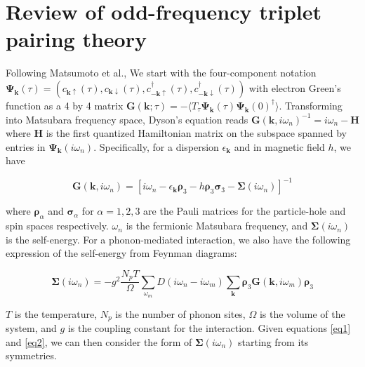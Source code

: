 \documentclass[a4paper,12pt]{article}
\begin{document}
\section{Review of odd-frequency triplet pairing theory}

\noindent Following Matsumoto et al.\cite{Matsumoto}, We start with the four-component notation $\mathbf{\Psi}_{\mathbf{k}}(\tau)=(c_{\mathbf{k}\uparrow}(\tau), c_{\mathbf{k}\downarrow}(\tau), c_{-\mathbf{k}\uparrow}^{\dag}(\tau), c_{-\mathbf{k}\downarrow}^{\dag}(\tau))$ with electron Green's function as a 4 by 4 matrix $\textbf{G}(\mathbf{k};\tau)=-\langle T_{\tau}\mathbf{\Psi_{k}}(\tau)\mathbf{\Psi_{k}}(0)^{\dag}\rangle$. Transforming into Matsubara frequency space, Dyson's equation reads $\textbf{G}(\textbf{k},i\omega_{n})^{-1}=i\omega_{n}-\textbf{H}$ where $\textbf{H}$ is the first quantized Hamiltonian matrix on the subspace spanned by entries in $\boldsymbol\Psi_\textbf{k}(i\omega_{n})$. Specifically, for a dispersion  $\epsilon_{\textbf{k}}$ and in magnetic field $h$, we have

\begin{equation} \label{eq1}
    \textbf{G}(\textbf{k},i\omega_{n})=[i\omega_{n}-\epsilon_{\mathbf{k}}\boldsymbol\rho_{3}-h\boldsymbol\rho_{3}\boldsymbol\sigma_{3}-\boldsymbol\Sigma(i\omega_{n})]^{-1}
\end{equation}

\noindent where $\boldsymbol\rho_{\alpha}$ and $\boldsymbol\sigma_{\alpha}$ for $\alpha=1,2,3$ are the Pauli matrices for the particle-hole and spin spaces respectively. $\omega_{n}$ is the fermionic Matsubara frequency, and $\boldsymbol\Sigma(i\omega_{n})$ is the self-energy. For a phonon-mediated interaction, we also have the following expression of the self-energy from Feynman diagrams:

\begin{equation} \label{eq2}
    \boldsymbol\Sigma(i\omega_{n})=-g^{2}\frac{N_{p}T}{\Omega}\sum_{\omega_{m}}D(i\omega_{n}-i\omega_{m})\sum_{\textbf{k}}\boldsymbol\rho_{3}\textbf{G}(\textbf{k},i\omega_{m})\boldsymbol\rho_{3}
\end{equation}

\noindent $T$ is the temperature, $N_{p}$ is the number of phonon sites, $\Omega$ is the volume of the system, and $g$ is the coupling constant for the interaction. Given equations \ref{eq1} and \ref{eq2}, we can then consider the form of $\boldsymbol{\Sigma}(i\omega_{n})$ starting from its symmetries.
\end{document}
